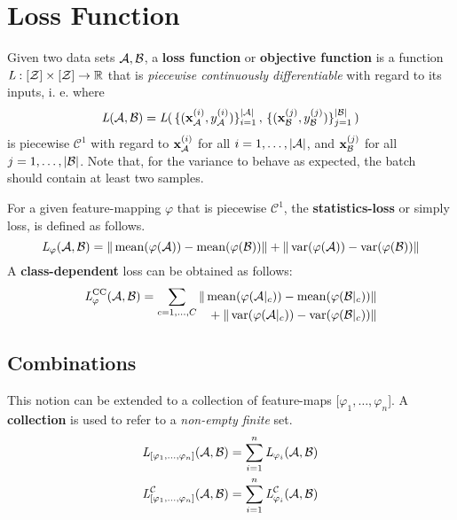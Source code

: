 \section{Loss Function}
Given two data sets $\mathcal A, \mathcal B$, a \textbf{loss function} or \textbf{objective function} is a function $\textit{L} : [\mathcal Z] \times [\mathcal Z] \to \mathbb{R}$ that is \textit{piecewise continuously differentiable} with regard to its inputs,
i. e. where 
\[
    \textit{L} (\mathcal A, \mathcal B) = \textit{L} (
    \,\{(\mathbf x^{(i)}_{\mathcal A}, y^{(i)}_{\mathcal A})\}_{i=1}^{|\mathcal A|}\,,
    \,\{(\mathbf x^{(j)}_{\mathcal B}, y^{(j)}_{\mathcal B})\}_{j=1}^{|\mathcal B|}\,) 
\]
is piecewise $\mathcal C^1$ with regard to $\mathbf x^{(i)}_{\mathcal A}$
for all $i=1, \dots, |\mathcal A|$, and $\mathbf x^{(j)}_{\mathcal B}$ for all $j=1, \dots, |\mathcal B|$.
Note that, for the variance to behave as expected, the batch should contain at least two samples.

For a given feature-mapping $\varphi$ that is piecewise $\mathcal C ^1$, the \textbf{statistics-loss} or simply loss, is defined as follows.
% 
\begin{equation}
    \textit{L} _{\varphi} (\mathcal A, \mathcal B) = 
    \|\operatorname{mean} ({\varphi (\mathcal A)}) - \operatorname{mean} ({\varphi (\mathcal B)})\| +
    \|\operatorname{var} ({\varphi (\mathcal A)}) - \operatorname{var} ({\varphi (\mathcal B)})\|
    \label{eqn:statistics_loss}
\end{equation}
% 
A \textbf{class-dependent} loss can be obtained as follows:
\begin{align}
\begin{split}
\label{eqn:class_statistics_loss}
    \textit{L} _\varphi ^\text{CC} (\mathcal A, \mathcal B) =
    \sum _{c = 1, \dots, C}
    \begin{alignedat}[t]{1}
        \|\operatorname{mean} ({\varphi (\mathcal A|_c)}) - \operatorname{mean}({\varphi (\mathcal B|_c)}) &\| \\
        {} + \|\operatorname{var} ({\varphi (\mathcal A|_c)}) - \operatorname{var} ({\varphi (\mathcal B|_c)}) &\| 
    \end{alignedat}
\end{split}
\end{align}

\subsection{Combinations}
% 
This notion can be extended to a collection of feature-maps [$\varphi_1, \dots, \varphi_n$].
A \textbf{collection} is used to refer to a \textit{non-empty finite} set.
\begin{align*}
    \textit{L}_{[\varphi_1, \dots, \varphi_n]} (\mathcal A, \mathcal B) &= 
    \sum_{i=1}^n \textit{L}_{\varphi_i} (\mathcal A, \mathcal B) \\
    \textit{L}_{[\varphi_1, \dots, \varphi_n]}^{\mathcal C} (\mathcal A, \mathcal B) &= 
    \sum_{i=1}^n \textit{L}_{\varphi_i}^{\mathcal C} (\mathcal A, \mathcal B)
\end{align*}
